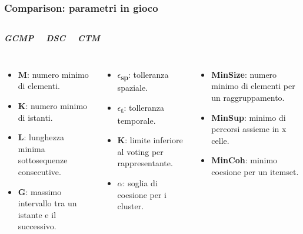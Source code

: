\documentclass{beamer}
\begin{document}
\begin{frame}
	\frametitle{Comparison: parametri in gioco}
	\begin{columns}
		
		\begin{center}
			\textbf{\textit{\huge{GCMP}}}
			
		\end{center}
		
		\begin{center}
			\textbf{\textit{\huge{DSC}}}
			
		\end{center}
		
		\begin{center}
			\textbf{\textit{\huge{CTM}}}
			
		\end{center}
	\end{columns}
	\begin{columns}
		
		\column{.3\columnwidth}

\begin{itemize}
	\item \textbf{M}: numero minimo di elementi.
	\item \textbf{K}: numero minimo di istanti.
	\item \textbf{L}: lunghezza minima sottosequenze consecutive.
	\item \textbf{G}: massimo intervallo tra un istante e il successivo.
\end{itemize}
		
		
		\column{.3\textwidth}
		
			\begin{itemize}
			\item \textbf{$\epsilon$\textsubscript{sp}}: tolleranza spaziale.
			\item \textbf{$\epsilon$\textsubscript{t}}: tolleranza temporale.
			\item \textbf{K}: limite inferiore al voting per rappresentante.
			\item \textbf{$\alpha$}: soglia di coesione per i cluster. 
		\end{itemize}
		
		\column{.3\textwidth}
		
	\begin{itemize}
		\item \textbf{MinSize}: numero minimo di elementi per un raggruppamento.
		\item \textbf{MinSup}: minimo di percorsi assieme in x celle.
		\item \textbf{MinCoh}: minimo coesione per un itemset.
	\end{itemize}
		
	\end{columns}
\end{frame}    
\end{document}
